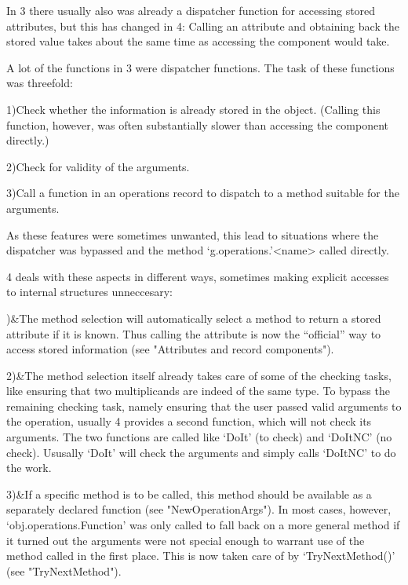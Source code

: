 In {\GAP}3 there usually also was already a dispatcher function for
accessing stored attributes, but 
this has changed in {\GAP}4: Calling
an attribute and obtaining back the stored value takes about the same time
as accessing the component would take.


A lot of the functions in {\GAP}3 were dispatcher functions. The task of
these functions was threefold:

1)\quad Check whether the information is already stored in the object.
(Calling this function, however, was often substantially slower
than accessing the component directly.)

2)\quad Check for validity of the arguments.

3)\quad Call a function in an operations record to dispatch to a method suitable
for the arguments.

As these features were sometimes unwanted, this lead to situations where
the dispatcher was bypassed and the method `g.operations.'<name> called
directly.

{\GAP}4 deals with these aspects in different ways, sometimes making
explicit accesses to internal structures unneccesary:

)&The method selection will automatically select a method to return a
stored attribute if it is known. Thus calling the attribute is now the
``official'' way to access stored information (see "Attributes and record
components").

2)&The method selection itself already takes care of some of the checking
tasks, like ensuring that two multiplicands are indeed of the same type. To
bypass the remaining checking task, namely ensuring that the user passed
valid arguments to the operation, usually {\GAP}4 provides a second
function, which will not check its arguments.
The two functions are called like `DoIt' (to check) and `DoItNC' (no
check). Ususally `DoIt' will check the arguments and simply calls `DoItNC'
to do the work.

3)&If a specific method is to be called, this method should be available as a
separately declared function (see "NewOperationArgs"). In most cases, however,
`obj.operations.Function' was only called to fall back on a more general
method if it turned out the arguments were not special enough to warrant use
of the method called in the first place. This is now taken care of by
`TryNextMethod()' (see "TryNextMethod").

